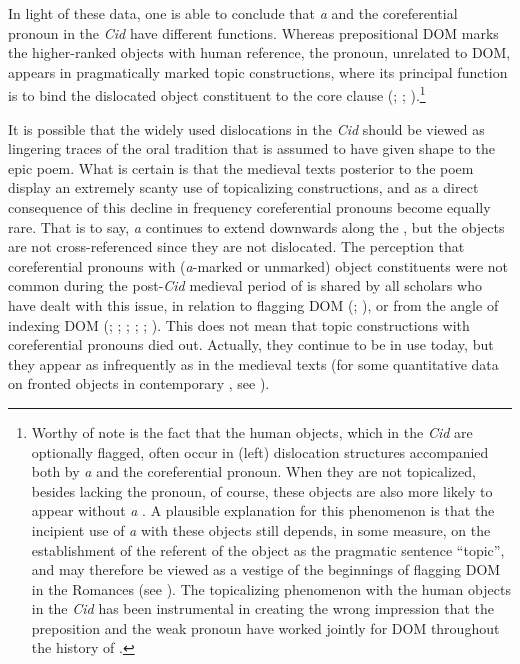 \documentclass[output=paper]{LSP/langsci}
\begin{document}
 In light of these data, one is able to conclude that \textit{a} and the coreferential pronoun in the \textit{Cid} have different functions. Whereas prepositional DOM marks the higher-ranked objects with human reference, the pronoun, unrelated to DOM, appears in pragmatically marked topic constructions, where its principal function is to bind the dislocated object constituent to the core clause (\citealt[84]{Keniston1937Syntax}; \citealt[109]{Nocentini2003Object}; \citealt[757]{RealAcademia2010Espanola}).\footnote{Worthy of note is the fact that the human  objects, which in the \textit{Cid} are optionally flagged, often occur in (left) dislocation structures accompanied both by \textit{a} and the coreferential pronoun. When they are not topicalized, besides lacking the pronoun, of course, these objects are also more likely to appear without \textit{a} \citep{Melis1995Objetodirecto}. A plausible explanation for this phenomenon is that the incipient use of \textit{a} with these objects still depends, in some measure, on the establishment of the referent of the object as the pragmatic sentence “topic”, and may therefore be viewed as a vestige of the beginnings of flagging DOM in the Romances (see  ). The topicalizing phenomenon with the human  objects in the \textit{Cid} has been instrumental in creating the wrong impression that the preposition and the weak pronoun have worked jointly for DOM throughout the history of .}

 It is possible that the widely used dislocations in the \textit{Cid} should be viewed as lingering traces of the oral tradition that is assumed to have given shape to the epic poem. What is certain is that the medieval texts posterior to the poem display an extremely scanty use of topicalizing constructions, and as a direct consequence of this decline in frequency coreferential pronouns become equally rare. That is to say, \textit{a} continues to extend downwards along the , but the objects are not cross-referenced since they are not dislocated. The perception that coreferential pronouns with (\textit{a}-marked or unmarked) object constituents were not common during the post-\textit{Cid} medieval period of  is shared by all scholars who have dealt with this issue, in relation to flagging DOM (\citealt{Laca2006Objeto}; \citealt{vonHeusingeretal2005Evolution}), or from the angle of indexing DOM (\citealt{Silva-Corvalan1984Semantic}; \citealt{Rini1991Redundant}; \citealt{Fontana1993Phrase}; \citealt{Eberenz2000Espanol}; \citealt{Gabrieletal2010Information}; \citealt{Rozasetal2012Object}). This does not mean that topic constructions with coreferential pronouns died out. Actually, they continue to be in use today, but they appear as infrequently as in the medieval texts (for some quantitative data on fronted objects in contemporary , see \citealt[215–216]{Garcia2015Variable}).
\end{document}
